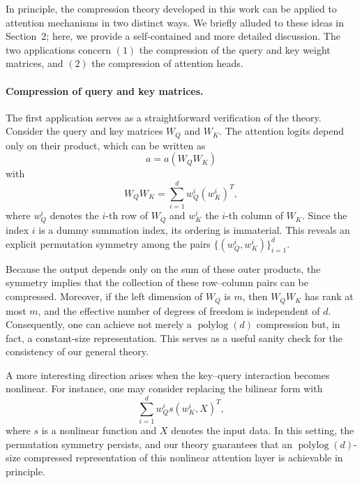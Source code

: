 \documentclass{article}
\theoremstyle{plain}
\newenvironment{REV*}
  {\begingroup\color[HTML]{000000}}
  {\endgroup}
\begin{document}
\begin{REV*}

In principle, the compression theory developed in this work can be applied to attention mechanisms in two distinct ways. We briefly alluded to these ideas in Section~2; here, we provide a self-contained and more detailed discussion. The two applications concern \((1)\) the compression of the query and key weight matrices, and \((2)\) the compression of attention heads.

\paragraph{Compression of query and key matrices.}
The first application serves as a straightforward verification of the theory. Consider the query and key matrices \(W_Q\) and \(W_K\). The attention logits depend only on their product, which can be written as
\begin{equation}
a = a\!\left(W_Q W_K\right)
\end{equation}
with
\begin{equation}
W_Q W_K = \sum_{i=1}^d w_Q^i \left(w_K^i\right)^{T},
\end{equation}
where \(w_Q^i\) denotes the \(i\)-th row of \(W_Q\) and \(w_K^i\) the \(i\)-th column of \(W_K\). Since the index \(i\) is a dummy summation index, its ordering is immaterial. This reveals an explicit permutation symmetry among the pairs \(\{(w_Q^i, w_K^i)\}_{i=1}^d\).

Because the output depends only on the sum of these outer products, the symmetry implies that the collection of these row–column pairs can be compressed. Moreover, if the left dimension of \(W_Q\) is \(m\), then \(W_Q W_K\) has rank at most \(m\), and the effective number of degrees of freedom is independent of \(d\). Consequently, one can achieve not merely a \(\operatorname{polylog}(d)\) compression but, in fact, a constant-size representation. This serves as a useful sanity check for the consistency of our general theory.

A more interesting direction arises when the key–query interaction becomes nonlinear. For instance, one may consider replacing the bilinear form with
\begin{equation}
\sum_{i=1}^d w_Q^i s\!\left(w_K^i, X\right)^{T},
\end{equation}
where \(s\) is a nonlinear function and \(X\) denotes the input data. In this setting, the permutation symmetry persists, and our theory guarantees that an \(\operatorname{polylog}(d)\)-size compressed representation of this nonlinear attention layer is achievable in principle.


\end{REV*}
\end{document}
